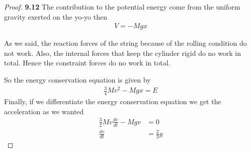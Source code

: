 \documentclass[11pt]{article}
\theoremstyle{definition}
\begin{document}
\begin{proof}{\textbf{9.12}}
        The contribution to the potential energy come from the uniform
        gravity exerted on the yo-yo then
        \begin{align*}
            V = -Mgx
        \end{align*}

        As we said, the reaction forces of the string because of the rolling
        condition do not work.
        Also, the internal forces that keep the cylinder rigid do no work in
        total.
        Hence the constraint forces do no work in total.

        So the energy conservation equation is given by
        \begin{align*}
            \frac{3}{4}Mv^2 - Mgx = E 
        \end{align*}
        Finally, if we differentiate the energy conservation equation we get
        the acceleration as we wanted
        \begin{align*}
            \frac{3}{2}Mv\frac{dv}{dt} - Mgv &= 0\\
            \frac{dv}{dt} &= \frac{2}{3}g
        \end{align*}

    \end{proof}
\end{document}
